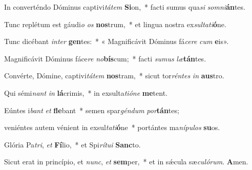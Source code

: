 \item In converténdo Dóminus captivi\textit{tátem} \textbf{Si}on,~* facti sumus qua\textit{si} \textit{somni}\textbf{án}tes.

\item Tunc replétum est gáudi\textit{o} \textit{os} \textbf{nos}trum,~* et lingua nostra ex\textit{sultati}\textbf{ó}ne.

\item Tunc dicébant \textit{inter} \textbf{gen}tes:~* « Magnificávit Dóminus fá\textit{cere} \textit{cum} \textbf{e}is».

\item Magnificávit Dóminus fáce\textit{re} \textit{no}\textbf{bís}cum;~* facti \textit{sumus} \textit{læ}\textbf{tán}tes.

\item Convérte, Dómine, captivi\textit{tátem} \textbf{nos}tram,~* sicut tor\textit{réntes} \textit{in} \textbf{aus}tro.

\item Qui sémi\textit{nant} \textit{in} \textbf{lá}crimis,~* in exsulta\textit{tióne} \textbf{me}tent.

\item Eúntes i\textit{bant} \textit{et} \textbf{fle}bant~* semen spar\textit{géndum} \textit{por}\textbf{tán}tes;

\item veniéntes autem vénient in exsul\textit{tati}\textbf{ó}ne~* portántes ma\textit{nípulos} \textbf{su}os.

\item Glória Pa\textit{tri}, \textit{et} \textbf{Fí}lio,~* et Spi\textit{rítui} \textbf{Sanc}to.

\item Sicut erat in princípio, et \textit{nunc}, \textit{et} \textbf{sem}per,~* et in sǽcula sæ\textit{culórum}. \textbf{A}men.